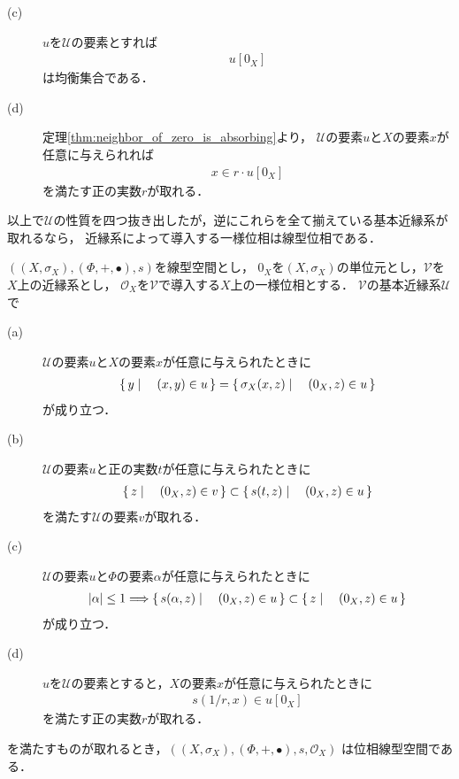 \begin{description}
		\item[(c)] $u$を$\mathscr{U}$の要素とすれば
			\begin{align}
				u[0_X]
			\end{align}
			は均衡集合である．
			
		\item[(d)] 定理\ref{thm:neighbor_of_zero_is_absorbing}より，
			$\mathscr{U}$の要素$u$と$X$の要素$x$が任意に与えられれば
			\begin{align}
				x \in r \cdot u[0_X]
			\end{align}
			を満たす正の実数$r$が取れる．
	\end{description}
	
	以上で$\mathscr{U}$の性質を四つ抜き出したが，逆にこれらを全て揃えている基本近縁系が取れるなら，
	近縁系によって導入する一様位相は線型位相である．
	
	\begin{screen}
		\begin{thm}[線型位相を導入する近縁系]
		\label{thm:entourages_introducing_vector_topology}
			$\left(\left(X,\sigma_X\right),(\Phi,+,\bullet),s\right)$を線型空間とし，
			$0_X$を$\left(X,\sigma_X\right)$の単位元とし，$\mathscr{V}$を$X$上の近縁系とし，
			$\mathscr{O}_X$を$\mathscr{V}$で導入する$X$上の一様位相とする．
			$\mathscr{V}$の基本近縁系$\mathscr{U}$で
			\begin{description}
				\item[(a)] $\mathscr{U}$の要素$u$と$X$の要素$x$が任意に与えられたときに
					\begin{align}
						\left\{\, y \mid \quad (x,y) \in u\, \right\} = \left\{\, \sigma_X(x,z) \mid \quad (0_X,z) \in u\, \right\}
					\end{align}
					が成り立つ．
						
				\item[(b)] $\mathscr{U}$の要素$u$と正の実数$t$が任意に与えられたときに
					\begin{align}
						\left\{\, z \mid \quad (0_X,z) \in v\, \right\} \subset \left\{\, s(t,z) \mid \quad (0_X,z) \in u\, \right\}
					\end{align}
					を満たす$\mathscr{U}$の要素$v$が取れる．
					
				\item[(c)] $\mathscr{U}$の要素$u$と$\Phi$の要素$\alpha$が任意に与えられたときに
					\begin{align}
						|\alpha| \leq 1 \Longrightarrow \left\{\, s(\alpha,z) \mid \quad (0_X,z) \in u\, \right\} \subset \left\{\, z \mid \quad (0_X,z) \in u\, \right\}
					\end{align}
					が成り立つ．
					
				\item[(d)] $u$を$\mathscr{U}$の要素とすると，$X$の要素$x$が任意に与えられたときに
					\begin{align}
						s(1/r,x) \in u[0_X]
					\end{align}
					を満たす正の実数$r$が取れる．
			\end{description}
			を満たすものが取れるとき，$\left(\left(X,\sigma_X\right),(\Phi,+,\bullet),s,\mathscr{O}_X\right)$
			は位相線型空間である．
		\end{thm}
	\end{screen}
	
